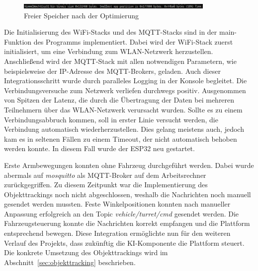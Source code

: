 \begin{figure}[H]
    \centering
    \includegraphics[width=0.85\textwidth]{images/memory_size_after.png}
    \caption{Freier Speicher nach der Optimierung}
    \label{fig:memory_size_after}
\end{figure}

Die Initialisierung des WiFi-Stacks und des MQTT-Stacks sind in der main-Funktion des Programms implementiert. Dabei wird der WiFi-Stack zuerst initialisiert, um eine Verbindung zum WLAN-Netzwerk herzustellen. Anschließend wird der MQTT-Stack mit allen notwendigen Parametern, wie beispielsweise der IP-Adresse des MQTT-Brokers, geladen. Auch dieser Integrationsschritt wurde durch paralleles Logging in der Konsole begleitet. Die Verbindungsversuche zum Netzwerk verliefen durchwegs positiv. Ausgenommen von Spitzen der Latenz, die durch die Übertragung der Daten bei mehreren Teilnehmern über das WLAN-Netzwerk verursacht wurden. Sollte es zu einem Verbindungsabbruch kommen, soll in erster Linie versucht werden, die Verbindung automatisch wiederherzustellen. Dies gelang meistens auch, jedoch kam es in seltenen Fällen zu einem Timeout, der nicht automatisch behoben werden konnte. In diesem Fall wurde der ESP32 neu gestartet. \newline

Erste Armbewegungen konnten ohne Fahrzeug durchgeführt werden. Dabei wurde abermals auf \textit{mosquitto} als MQTT-Broker auf dem Arbeitsrechner zurückgegriffen. Zu diesem Zeitpunkt war die Implementierung des Objekttrackings noch nicht abgeschlossen, weshalb die Nachrichten noch manuell gesendet werden mussten. Feste Winkelpositionen konnten nach manueller Anpassung erfolgreich an den Topic \textit{vehicle/turret/cmd} gesendet werden. Die Fahrzeugsteuerung konnte die Nachrichten korrekt empfangen und die Plattform entsprechend bewegen. Diese Integration ermöglichte nun für den weiteren Verlauf des Projekts, dass zukünftig die KI-Komponente die Plattform steuert. Die konkrete Umsetzung des Objekttrackings wird im Abschnitt~\ref{sec:objekttracking} beschrieben. \newline